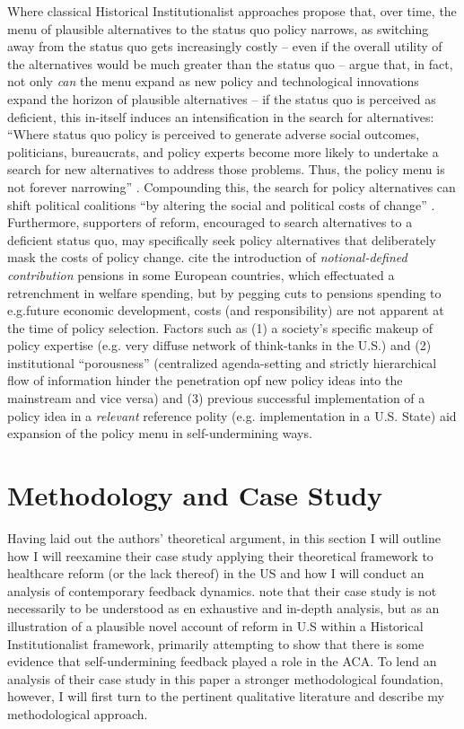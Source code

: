 \documentclass[11pt]{article}
\begin{document}
Where classical Historical Institutionalist approaches propose that, over time, the menu of plausible alternatives to the status quo policy narrows, as switching away from the status quo gets increasingly costly -- even if the overall utility of the alternatives would be much greater than the status quo --\textcite[][]{Jacobs2014} argue that, in fact, not only \textit{can} the menu expand as new policy and technological innovations expand the horizon of plausible alternatives -- if the status quo is perceived as deficient, this in-itself induces an intensification in the search for alternatives: \enquote{Where status quo policy is perceived to generate adverse social outcomes, politicians, bureaucrats, and policy experts become more likely to undertake a search for new alternatives to address those problems. Thus, the policy menu is not forever narrowing} . Compounding this, the search for policy alternatives can shift political coalitions \enquote{by altering the social and political costs of change} \parencite[][p. 449]{Jacobs2014}. Furthermore, supporters of reform, encouraged to search alternatives to a deficient status quo, may specifically seek policy alternatives that deliberately mask the costs of policy change. \textcite[][]{Jacobs2014} cite the introduction of \textit{notional-defined contribution} pensions in some European countries, which effectuated a retrenchment in welfare spending, but by pegging cuts to pensions spending to e.g.future economic development, costs (and responsibility) are not apparent at the time of policy selection. Factors such as (1) a society's specific makeup of policy expertise (e.g. very diffuse network of think-tanks in the U.S.) and (2) institutional \enquote{porousness} \parencite[][p. 449]{Jacobs2014} (centralized agenda-setting and strictly hierarchical flow of information hinder the penetration opf new policy ideas into the mainstream and vice versa) and (3) previous successful implementation of a policy idea in a \textit{relevant} reference polity (e.g. implementation in a U.S. State) aid expansion of the policy menu in self-undermining ways.

\section*{Methodology and Case Study}

Having laid out the authors' theoretical argument, in this section I will outline how I will reexamine their case study applying their theoretical framework to healthcare reform (or the lack thereof) in the US and how I will conduct an analysis of contemporary feedback dynamics. \textcite[][]{Jacobs2014} note that their case study is not necessarily to be understood as en exhaustive and in-depth analysis, but as an illustration of a plausible novel account of reform in U.S within a Historical Institutionalist framework, primarily attempting to show that there is some evidence that self-undermining feedback played a role in the ACA. To lend an analysis of their case study in this paper a stronger methodological foundation, however, I will first turn to the pertinent qualitative literature and describe my methodological approach.
\end{document}
